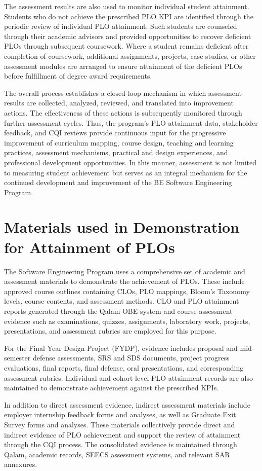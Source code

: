 The assessment results are also used to monitor individual student attainment. Students who do not achieve the prescribed PLO KPI are identified through the periodic review of individual PLO attainment. Such students are counseled through their academic advisors and provided opportunities to recover deficient PLOs through subsequent coursework. Where a student remains deficient after completion of coursework, additional assignments, projects, case studies, or other assessment modules are arranged to ensure attainment of the deficient PLOs before fulfillment of degree award requirements.

The overall process establishes a closed-loop mechanism in which assessment results are collected, analyzed, reviewed, and translated into improvement actions. The effectiveness of these actions is subsequently monitored through further assessment cycles. Thus, the program's PLO attainment data, stakeholder feedback, and CQI reviews provide continuous input for the progressive improvement of curriculum mapping, course design, teaching and learning practices, assessment mechanisms, practical and design experiences, and professional development opportunities. In this manner, assessment is not limited to measuring student achievement but serves as an integral mechanism for the continued development and improvement of the BE Software Engineering Program.
\hypertarget{sec:materials}{%
\section{Materials used in Demonstration for Attainment of PLOs}\label{sec:materials}}

The Software Engineering Program uses a comprehensive set of academic and assessment materials to demonstrate the achievement of PLOs. These include approved course outlines containing CLOs, PLO mappings, Bloom's Taxonomy levels, course contents, and assessment methods. CLO and PLO attainment reports generated through the Qalam OBE system and course assessment evidence such as examinations, quizzes, assignments, laboratory work, projects, presentations, and assessment rubrics are employed for this purpose.

For the Final Year Design Project (FYDP), evidence includes proposal and mid-semester defense assessments, SRS and SDS documents, project progress evaluations, final reports, final defense, oral presentations, and corresponding assessment rubrics. Individual and cohort-level PLO attainment records are also maintained to demonstrate achievement against the prescribed KPIs.

In addition to direct assessment evidence, indirect assessment materials include employer internship feedback forms and analyses, as well as Graduate Exit Survey forms and analyses. These materials collectively provide direct and indirect evidence of PLO achievement and support the review of attainment through the CQI process. The consolidated evidence is maintained through Qalam, academic records, SEECS assessment systems, and relevant SAR annexures.

